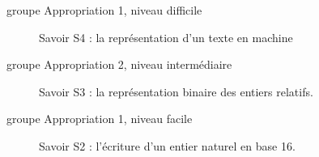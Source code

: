 



\begin{description}
    \item[groupe Appropriation 1, niveau difficile] Savoir S4 : la représentation d'un texte en machine
    \item[groupe Appropriation 2, niveau intermédiaire] Savoir S3 : la représentation binaire des entiers relatifs.
    \item[groupe Appropriation 1, niveau facile] Savoir S2 : l'écriture d'un entier naturel en base 16.
\end{description}

\newpage
